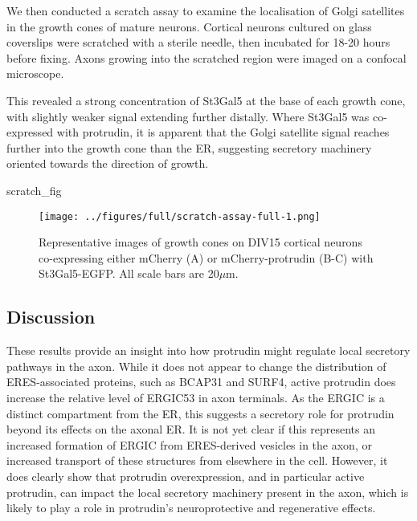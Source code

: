 \documentclass[
  12pt,
  a4paper,
]{article}
\newenvironment{Shaded}{\begin{snugshade}}{\end{snugshade}}
\newcommand{\NormalTok}[1]{#1}
\begin{document}
We then conducted a scratch assay to examine the localisation of Golgi
satellites in the growth cones of mature neurons. Cortical neurons
cultured on glass coverslips were scratched with a sterile needle, then
incubated for 18-20 hours before fixing. Axons growing into the
scratched region were imaged on a confocal microscope.

This revealed a strong concentration of St3Gal5 at the base of each
growth cone, with slightly weaker signal extending further distally.
Where St3Gal5 was co-expressed with protrudin, it is apparent that the
Golgi satellite signal reaches further into the growth cone than the ER,
suggesting secretory machinery oriented towards the direction of growth.

\begin{Shaded}
\begin{Highlighting}[]
\NormalTok{scratch\_fig}
\end{Highlighting}
\end{Shaded}

\begin{figure}
\centering
\texttt{[image: ../figures/full/scratch-assay-full-1.png]}
\caption{Representative images of growth cones on DIV15 cortical neurons
co-expressing either mCherry (A) or mCherry-protrudin (B-C) with
St3Gal5-EGFP. All scale bars are 20\(\mu\)m.}
\end{figure}

\hypertarget{discussion}{%
\subsection{Discussion}\label{discussion}}

These results provide an insight into how protrudin might regulate local
secretory pathways in the axon. While it does not appear to change the
distribution of ERES-associated proteins, such as BCAP31 and SURF4,
active protrudin does increase the relative level of ERGIC53 in axon
terminals. As the ERGIC is a distinct compartment from the ER, this
suggests a secretory role for protrudin beyond its effects on the axonal
ER. It is not yet clear if this represents an increased formation of
ERGIC from ERES-derived vesicles in the axon, or increased transport of
these structures from elsewhere in the cell. However, it does clearly
show that protrudin overexpression, and in particular active protrudin,
can impact the local secretory machinery present in the axon, which is
likely to play a role in protrudin's neuroprotective and regenerative
effects.
\end{document}
